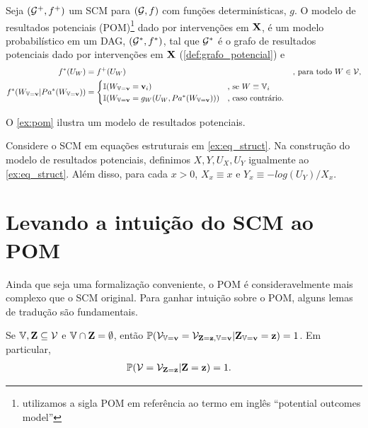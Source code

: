 \begin{definition}
 \label{def:pom}
 Seja $({\mathcal G}^+, f^+)$ um
 SCM para $({\mathcal G}, f)$
 com funções determinísticas, $g$.
 O modelo de resultados potenciais (POM)\footnote{
  utilizamos a sigla POM em referência ao
  termo em inglês ``potential outcomes model''} 
  dado por intervenções em ${\mathbf{X}}$,
 é um modelo probabilístico em um DAG, $({\mathcal G}^*, f^*)$, tal que
 ${\mathcal G}^*$ é o grafo de resultados potenciais
 dado por intervenções em ${\mathbf{X}}$ (\cref{def:grafo_potencial}) e
 \begin{align*}
  f^*(U_W) &= f^{+}(U_W) & \text{, para todo } W \in {\mathcal V}, \\
  f^*(W_{{\mathbb V}={\mathbf{v}}}|Pa^*(W_{{\mathbb V}={\mathbf{v}}}))
  &= 
  \begin{cases}
   {\mathbb I}(W_{{\mathbb V}={\mathbf{v}}} = {\mathbf{v}}_i) & \text{, se } W \equiv {\mathbb V}_i \\
   {\mathbb I}(W_{{\mathbb V}={\mathbf{v}}} = g_W(U_W, Pa^*(W_{{\mathbb V}={\mathbf{v}}}))) & \text{, caso contrário.}
  \end{cases}
 \end{align*}
\end{definition}

O \cref{ex:pom} ilustra 
um modelo de resultados potenciais.

\begin{example}
 \label{ex:pom}
 Considere o SCM em equações estruturais em \cref{ex:eq_struct}.
 Na construção do modelo de resultados potenciais,
 definimos $X, Y, U_X, U_Y$ igualmente ao \cref{ex:eq_struct}.
 Além disso, para cada $x > 0$,
 $X_{x} \equiv x$ e $Y_x \equiv -log(U_Y)/X_x$.
\end{example}

\section{Levando a intuição do SCM ao POM}
\label{sec:trad_scm_pom}

Ainda que seja uma formalização conveniente,
o POM é consideravelmente mais complexo que o SCM original.
Para ganhar intuição sobre o POM,
alguns lemas de tradução são fundamentais.

\begin{lemma} 
 \label{lemma:obs_to_potential}
 Se ${\mathbb V}, {\mathbf{Z}} \subseteq {\mathcal V}$ e
 ${\mathbb V} \cap {\mathbf{Z}} = \emptyset$, então
 ${\mathbb P}({\mathcal V}_{{\mathbb V}={\mathbf{v}}} = {\mathcal V}_{{\mathbf{Z}}={\mathbf{z}}, {\mathbb V}={\mathbf{v}}}|{\mathbf{Z}}_{{\mathbb V}={\mathbf{v}}}={\mathbf{z}}) = 1$.
 Em particular,
 \begin{align*}
  {\mathbb P}({\mathcal V} = {\mathcal V}_{{\mathbf{Z}}={\mathbf{z}}}|{\mathbf{Z}} = {\mathbf{z}}) &= 1.
 \end{align*}
\end{lemma}


